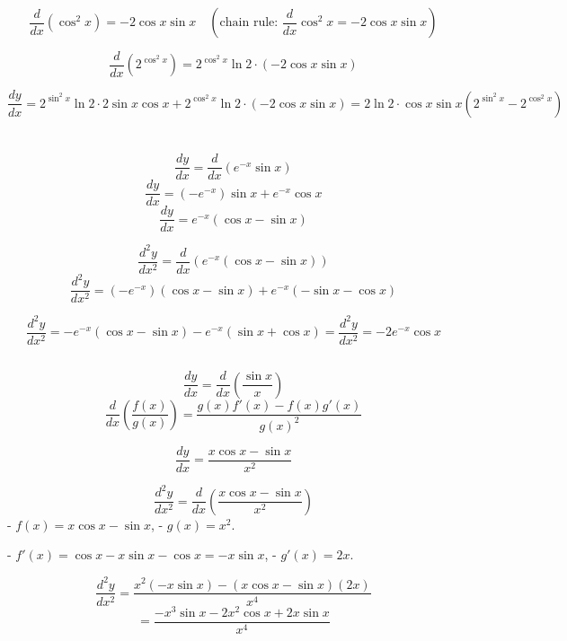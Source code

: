 \documentclass{article}
\begin{document}
\[
\frac{d}{dx} \left( \cos^2{x} \right) = -2 \cos{x} \sin{x}
\quad (\text{chain rule: } \frac{d}{dx} \cos^2{x} = -2 \cos{x} \sin{x})
\]


\[
\frac{d}{dx} \left( 2^{\cos^2{x}} \right) = 2^{\cos^2{x}} \ln{2} \cdot (-2 \cos{x} \sin{x})
\]

\[
\frac{dy}{dx} = 2^{\sin^2{x}} \ln{2} \cdot 2 \sin{x} \cos{x} + 2^{\cos^2{x}} \ln{2} \cdot (-2 \cos{x} \sin{x})
 =\boxed{ 2 \ln{2} \cdot \cos{x} \sin{x} \left( 2^{\sin^2{x}} - 2^{\cos^2{x}} \right)}
\]
\section{}
\subsection{}

\[
\frac{dy}{dx} = \frac{d}{dx}\left( e^{-x} \sin{x} \right)
\]
\[
\frac{dy}{dx} = \left( -e^{-x} \right) \sin{x} + e^{-x} \cos{x}
\]
\[
\frac{dy}{dx} = e^{-x} \left( \cos{x} - \sin{x} \right)
\]

\[
\frac{d^2y}{dx^2} = \frac{d}{dx} \left( e^{-x} \left( \cos{x} - \sin{x} \right) \right)
\]
\[
\frac{d^2y}{dx^2} = \left( -e^{-x} \right) \left( \cos{x} - \sin{x} \right) + e^{-x} \left( -\sin{x} - \cos{x} \right)
\]

\[
\frac{d^2y}{dx^2} = -e^{-x} \left( \cos{x} - \sin{x} \right) - e^{-x} \left( \sin{x} + \cos{x} \right)
=
\boxed{\frac{d^2y}{dx^2} = -2 e^{-x} \cos{x}}
\]

\subsection{}

	\[
	\frac{dy}{dx} = \frac{d}{dx} \left( \frac{\sin{x}}{x} \right)
	\]
	\[
	\frac{d}{dx} \left( \frac{f(x)}{g(x)} \right) = \frac{g(x)f'(x) - f(x)g'(x)}{g(x)^2}
	\]


	\[
	\frac{dy}{dx} = \frac{x \cos{x} - \sin{x}}{x^2}
	\]
	
	\[
	\frac{d^2y}{dx^2} = \frac{d}{dx} \left( \frac{x \cos{x} - \sin{x}}{x^2} \right)
	\]
	- \( f(x) = x \cos{x} - \sin{x} \),
	- \( g(x) = x^2 \).
	
	- \( f'(x) = \cos{x} - x \sin{x} - \cos{x} = -x \sin{x} \),
	- \( g'(x) = 2x \).
	
\[
\frac{d^2y}{dx^2} = \frac{x^2(-x \sin{x}) - (x \cos{x} - \sin{x})(2x)}{x^4}
\]
\[
= \frac{-x^3 \sin{x} - 2x^2 \cos{x} + 2x \sin{x}}{x^4}
\]
\end{document}

